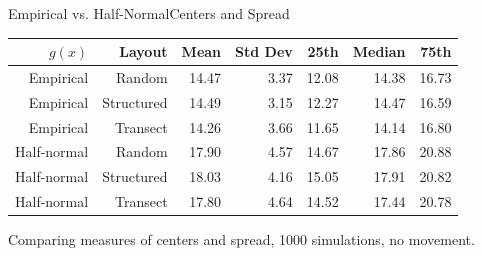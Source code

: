 \documentclass{beamer}
\begin{document}
\begin{frame}{Empirical vs. Half-Normal}{Centers and Spread}

\begin{table}
	\begin{tabular}{ r r |r r| r r r}
		$g(x)$      & Layout     & Mean  & Std Dev & 25th  & Median & 75th  \\ \hline\hline
		Empirical   & Random     & 14.47 & 3.37    & 12.08 & 14.38  & 16.73 \\
		Empirical   & Structured & 14.49 & 3.15    & 12.27 & 14.47  & 16.59 \\
		Empirical   & Transect   & 14.26 & 3.66    & 11.65 & 14.14  & 16.80 \\ \hline
		Half-normal & Random     & 17.90 & 4.57    & 14.67 & 17.86  & 20.88 \\
		Half-normal & Structured & 18.03 & 4.16    & 15.05 & 17.91  & 20.82 \\
		Half-normal & Transect   & 17.80 & 4.64    & 14.52 & 17.44  & 20.78
	\end{tabular}
\end{table}
\small
Comparing measures of centers and spread, 1000 simulations, no movement.

\end{frame}
\end{document}
